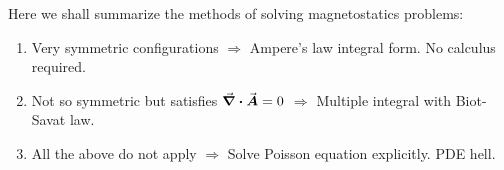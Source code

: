\documentclass[class=article, crop=false, 12pt]{standalone}
\begin{document}
\iffalse
\begin{notation}[Side note 1:]
    We can verify the identity 
    $\curl (\curl \vvec{F}) \equiv \grad (\div \vvec{F}) - \laplacian \vvec{F}$ by brute force.
    \aleq{
        \grad (\div \vvec{F}) &= \qty(\gradRec{})\qty(\divRec{F_x}[F_y][F_z]) \\[1ex]
        &= \qty(\pdv[2]{F_x}{x} + \pdv{F_y}{x}{y} + \pdv{F_z}{x}{z})\hhat{x}
        + \qty(\pdv{F_x}{y}{x} + \pdv[2]{F_y}{y} + \pdv{F_z}{y}{z})\hhat{y}
        + \qty(\pdv{F_x}{z}{x} + \pdv{F_y}{z}{y} + \pdv[2]{F_z}{z} )\hhat{z}\\[2ex]
        \laplacian \vvec{F} &= \qty(\lapRec{F_x})\hhat{x} 
            + \qty(\lapRec{F_y})\hhat{y} 
            + \qty(\lapRec{F_z})\hhat{z} 
    }

    Combining together, 
    \aleq{
        \grad (\div \vvec{F}) - \laplacian \vvec{F} 
        &= 
        \biggl[
            \pdv{y}\cub[blue]{\qty(\pdv{F_y}{x} -\pdv{F_x}{y})}{\text{z component of }\curl \vvec{F}} 
            - \pdv{z}\cub[blue]{\qty(\pdv{F_x}{z} -\pdv{F_z}{x})}{\text{y component of }\curl \vvec{F}}
        \biggr]\hhat{x}\\[1ex] %
        &\quad\ + \biggl[
            \pdv{x}\cub[blue]{\qty(\pdv{F_y}{x} -\pdv{F_x}{y})}{\text{z component of }\curl \vvec{F}} 
            + \pdv{z}\cub[blue]{\qty(\pdv{F_z}{y} -\pdv{F_y}{z})}{\text{x component of }\curl \vvec{F}}
        \biggr]\hhat{y}\\[1ex] %
        &\quad\ + \biggl[
            \pdv{x}\cub[blue]{\qty(\pdv{F_x}{z} -\pdv{F_z}{x})}{\text{y component of }\curl \vvec{F}} 
            + \pdv{y}\cub[blue]{\qty(\pdv{F_z}{y} -\pdv{F_y}{z})}{\text{x component of }\curl \vvec{F}}
        \biggr]\hhat{z}\\[1ex]
        &= \curl (\curl \vvec{F})
    }
\end{notation}
\fi

\linesep
Here we shall summarize the methods of solving magnetostatics problems:
\begin{enumerate}
    \item Very symmetric configurations 
    $\Rightarrow$ Ampere's law integral form. No calculus required.

    \item Not so symmetric but satisfies $\div \va*{A}=0$ 
    $\Rightarrow$ Multiple integral with Biot-Savat law.

    \item All the above do not apply 
    $\Rightarrow$ Solve Poisson equation explicitly. PDE hell. %
\end{enumerate}
\linesep
\theend
\end{document}
